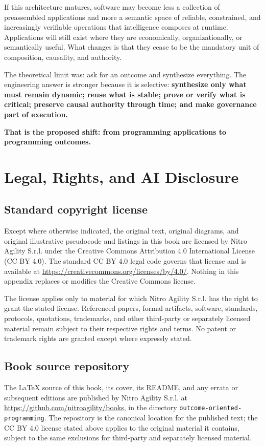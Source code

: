 \documentclass[10pt,oneside,openany]{book}
\newcommand{\mono}[1]{\texttt{#1}}
\begin{document}
If this architecture matures, software may become less a collection of preassembled applications and more a semantic space of reliable, constrained, and increasingly verifiable operations that intelligence composes at runtime. Applications will still exist where they are economically, organizationally, or semantically useful. What changes is that they cease to be the mandatory unit of composition, causality, and authority.

The theoretical limit was: ask for an outcome and synthesize everything. The engineering answer is stronger because it is selective: \textbf{synthesize only what must remain dynamic; reuse what is stable; prove or verify what is critical; preserve causal authority through time; and make governance part of execution.}

\textbf{That is the proposed shift: from programming applications to programming outcomes.}

\appendix

\chapter{Legal, Rights, and AI Disclosure}\label{app:legal}

\section{Standard copyright license}
Except where otherwise indicated, the original text, original diagrams, and original illustrative pseudocode and listings in this book are licensed by Nitro Agility S.r.l. under the Creative Commons Attribution 4.0 International License (CC BY 4.0). The standard CC BY 4.0 legal code governs that license and is available at \url{https://creativecommons.org/licenses/by/4.0/}. Nothing in this appendix replaces or modifies the Creative Commons license.

The license applies only to material for which Nitro Agility S.r.l. has the right to grant the stated license. Referenced papers, formal artifacts, software, standards, protocols, quotations, trademarks, and other third-party or separately licensed material remain subject to their respective rights and terms. No patent or trademark rights are granted except where expressly stated.

\section{Book source repository}
The LaTeX source of this book, its cover, its README, and any errata or subsequent editions are published by Nitro Agility S.r.l. at \url{https://github.com/nitroagility/books}, in the directory \mono{outcome-oriented-programming}. The repository is the canonical location for the published text; the CC BY 4.0 license stated above applies to the original material it contains, subject to the same exclusions for third-party and separately licensed material.
\end{document}
